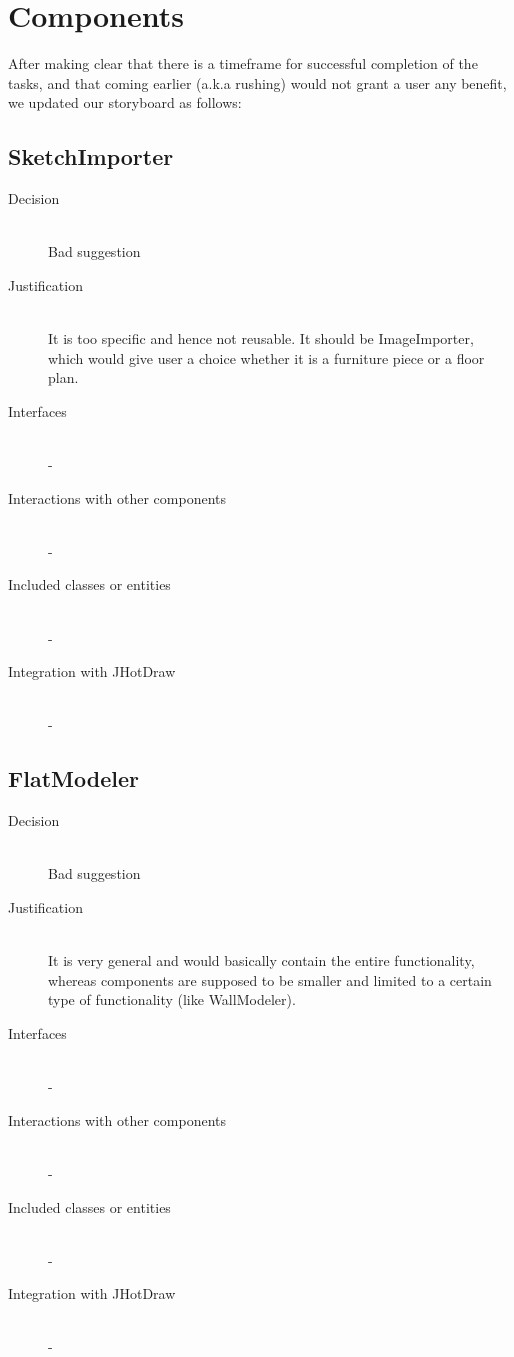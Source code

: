 \section{Components}

After making clear that there is a timeframe for successful completion of the tasks, and that coming earlier (a.k.a rushing) would not grant a user any benefit, we updated our storyboard as follows:

\subsection{SketchImporter}
	\begin{description}
		\item[Decision] \hfill \\ Bad suggestion
		\item[Justification] \hfill \\ It is too specific and hence not reusable. It should be ImageImporter, which would give user a choice whether it is a furniture piece or a floor plan.
		\item[Interfaces] \hfill \\ -
		\item[Interactions with other components] \hfill \\ -
		\item[Included classes or entities] \hfill \\ -
		\item[Integration with JHotDraw] \hfill \\ -
	\end{description}

\subsection{FlatModeler}
	\begin{description}
		\item[Decision] \hfill \\ Bad suggestion
		\item[Justification] \hfill \\ It is very general and would basically contain the entire functionality, whereas components are supposed to be smaller and limited to a certain type of functionality (like WallModeler).
		\item[Interfaces] \hfill \\ -
		\item[Interactions with other components] \hfill \\ -
		\item[Included classes or entities] \hfill \\ -
		\item[Integration with JHotDraw] \hfill \\ -
	\end{description}


